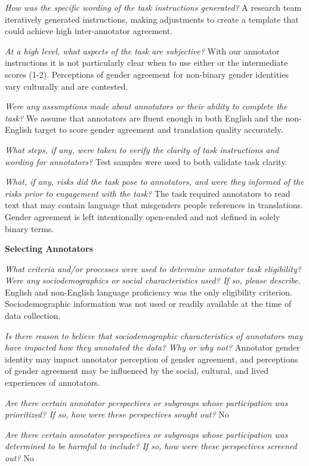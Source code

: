 \textit{How was the specific wording of the task instructions generated?}
A research team iteratively generated instructions, making adjustments to create a template that could achieve high inter-annotator agreement.

\textit{At a high level, what aspects of the task are subjective?}
With our annotator instructions it is not particularly clear when to use either or the intermediate scores (1-2).  Perceptions of gender agreement for non-binary gender identities vary culturally and are contested.

\textit{Were any assumptions made about annotators or their ability to complete the task?}
We assume that annotators are fluent enough in both English and the non-English target to score gender agreement and translation quality accurately.

\textit{What steps, if any, were taken to verify the clarity of task instructions and wording for annotators?}
Test samples were used to both validate task clarity.

\textit{What, if any, risks did the task pose to annotators, and were they informed of the risks prior to engagement with the task?}
The task required annotators to read text that may contain language that misgenders people references in translations.  Gender agreement is left intentionally open-ended and not defined in solely binary terms.

\textbf{Selecting Annotators}

\textit{What criteria and/or processes were used to determine annotator task eligibility? Were any sociodemographics or social characteristics used? If so, please describe.}
English and non-English language proficiency was the only eligibility criterion.
Sociodemographic information was not used or readily available at the time of data collection.

\textit{Is there reason to believe that sociodemographic characteristics of annotators may have impacted how they annotated the data? Why or why not?}
Annotator gender identity may impact annotator perception of gender agreement, and perceptions of gender agreement may be influenced by the social, cultural, and lived experiences of annotators.

\textit{Are there certain annotator perspectives or subgroups whose participation was prioritized? If so, how were these perspectives sought out?}
No

\textit{Are there certain annotator perspectives or subgroups whose participation was determined to be harmful to include? If so, how were these perspectives screened out?}
No

